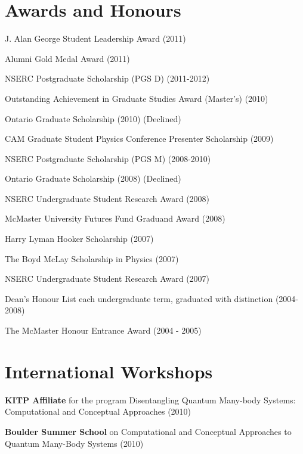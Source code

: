 \documentclass[letterpaper]{article}
\renewenvironment{itemize}{
  \begin{list}{}{
    \setlength{\leftmargin}{1.5em}
  }
}{
  \end{list}
}
\begin{document}
\section*{Awards and Honours}

\begin{itemize}

\item J. Alan George Student Leadership Award (2011)
\item Alumni Gold Medal Award (2011)
\item NSERC Postgraduate Scholarship (PGS D) (2011-2012)
\item Outstanding Achievement in Graduate Studies Award (Master's) (2010)
\item Ontario Graduate Scholarship (2010) (Declined)
\item CAM Graduate Student Physics Conference Presenter Scholarship (2009)
\item NSERC Postgraduate Scholarship (PGS M) (2008-2010)
\item Ontario Graduate Scholarship (2008) (Declined)
\item NSERC Undergraduate Student Research Award (2008)
\item McMaster University Futures Fund Graduand Award (2008)
\item Harry Lyman Hooker Scholarship (2007)
\item The Boyd McLay Scholarship in Physics (2007)
\item NSERC Undergraduate Student Research Award (2007)
\item Dean's Honour List each undergraduate term, graduated with distinction (2004-2008)
\item The McMaster Honour Entrance Award (2004 - 2005)
\end{itemize}

\section*{International Workshops}

\begin{itemize}

\item {\bf KITP Affiliate} for the program Disentangling Quantum Many-body Systems: Computational and Conceptual Approaches (2010)

\item {\bf Boulder Summer School} on Computational and Conceptual Approaches
to Quantum Many-Body Systems (2010)

\end{itemize}
\end{document}
